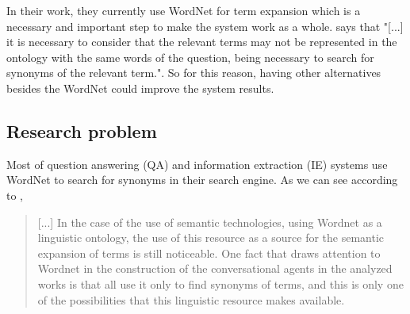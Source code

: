 In their work, they currently use WordNet for term expansion which is a necessary and important step to make the system work as a whole.  says that 
"[...] it is necessary to consider that the relevant terms may not be represented in the ontology with the same words of the question, being necessary to search for synonyms of the relevant term.". 
So for this reason, having other alternatives besides the WordNet could improve the system results.

\subsection{Research problem} 

Most of question answering (QA) and information extraction (IE) systems use WordNet to search for synonyms in their search engine. As we can see according to , 
\begin{quote}
    [...] In the case of the use of semantic technologies, using Wordnet as a linguistic ontology, the use of this resource as a source for the semantic expansion of terms is still noticeable. One fact that draws attention to Wordnet in the construction of the conversational agents in the analyzed works is that all use it only to find synonyms of terms, and this is only one of the possibilities that this linguistic resource makes available.
\end{quote}

